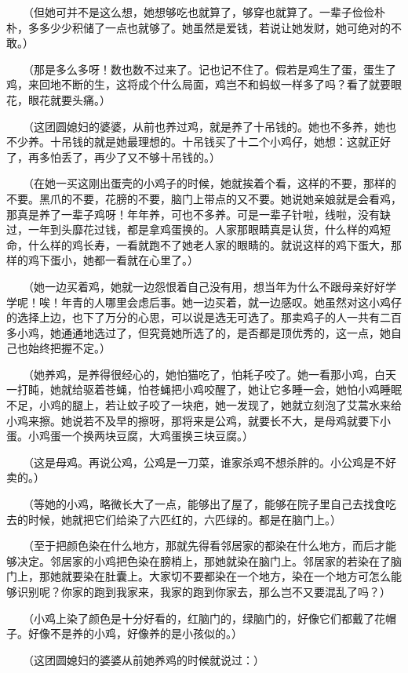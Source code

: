 \documentclass[UTF8]{ctexart}
\begin{document}
　　（但她可并不是这么想，她想够吃也就算了，够穿也就算了。一辈子俭俭朴朴，多多少少积储了一点也就够了。她虽然是爱钱，若说让她发财，她可绝对的不敢。）

　　（那是多么多呀！数也数不过来了。记也记不住了。假若是鸡生了蛋，蛋生了鸡，来回地不断的生，这将成个什么局面，鸡岂不和蚂蚁一样多了吗？看了就要眼花，眼花就要头痛。）

　　（这团圆媳妇的婆婆，从前也养过鸡，就是养了十吊钱的。她也不多养，她也不少养。十吊钱的就是她最理想的。十吊钱买了十二个小鸡仔，她想：这就正好了，再多怕丢了，再少了又不够十吊钱的。）

　　（在她一买这刚出蛋壳的小鸡子的时候，她就挨着个看，这样的不要，那样的不要。黑爪的不要，花膀的不要，脑门上带点的又不要。她说她亲娘就是会看鸡，那真是养了一辈子鸡呀！年年养，可也不多养。可是一辈子针啦，线啦，没有缺过，一年到头靡花过钱，都是拿鸡蛋换的。人家那眼睛真是认货，什么样的鸡短命，什么样的鸡长寿，一看就跑不了她老人家的眼睛的。就说这样的鸡下蛋大，那样的鸡下蛋小，她都一看就在心里了。）

　　（她一边买着鸡，她就一边怨恨着自己没有用，想当年为什么不跟母亲好好学学呢！唉！年青的人哪里会虑后事。她一边买着，就一边感叹。她虽然对这小鸡仔的选择上边，也下了万分的心思，可以说是选无可选了。那卖鸡子的人一共有二百多小鸡，她通通地选过了，但究竟她所选了的，是否都是顶优秀的，这一点，她自己也始终把握不定。）

　　（她养鸡，是养得很经心的，她怕猫吃了，怕耗子咬了。她一看那小鸡，白天一打盹，她就给驱着苍蝇，怕苍蝇把小鸡咬醒了，她让它多睡一会，她怕小鸡睡眠不足，小鸡的腿上，若让蚊子咬了一块疤，她一发现了，她就立刻泡了艾蒿水来给小鸡来擦。她说若不及早的擦呀，那将来是公鸡，就要长不大，是母鸡就要下小蛋。小鸡蛋一个换两块豆腐，大鸡蛋换三块豆腐。）

　　（这是母鸡。再说公鸡，公鸡是一刀菜，谁家杀鸡不想杀胖的。小公鸡是不好卖的。）

　　（等她的小鸡，略微长大了一点，能够出了屋了，能够在院子里自己去找食吃去的时候，她就把它们给染了六匹红的，六匹绿的。都是在脑门上。）

　　（至于把颜色染在什么地方，那就先得看邻居家的都染在什么地方，而后才能够决定。邻居家的小鸡把色染在膀梢上，那她就染在脑门上。邻居家的若染在了脑门上，那她就要染在肚囊上。大家切不要都染在一个地方，染在一个地方可怎么能够识别呢？你家的跑到我家来，我家的跑到你家去，那么岂不又要混乱了吗？）

　　（小鸡上染了颜色是十分好看的，红脑门的，绿脑门的，好像它们都戴了花帽子。好像不是养的小鸡，好像养的是小孩似的。）

　　（这团圆媳妇的婆婆从前她养鸡的时候就说过：）
\end{document}
